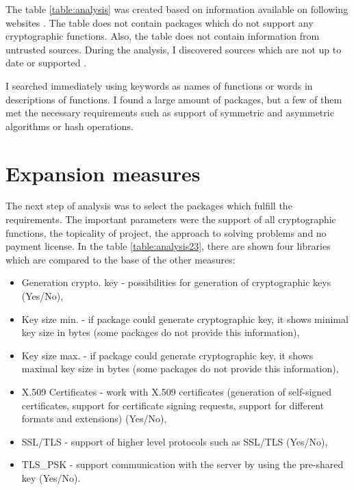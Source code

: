 \documentclass[
  twoside, 12pt, 
  printed, %
  notable,   %
  lof,     %
  lot,     %
]{fithesis3}
\begin{document}
The table \ref{table:analysis} was created based on information available on 
following websites \cite{security-golibrariesAndApps} \cite{cryptography-golibrariesAndApps} 
\cite{crypto-godoc} \cite{packages-thegoprogramminglanguage}. The 
table does not contain packages which do not support any cryptographic functions. Also, 
the table does not contain information from untrusted sources. During the analysis, I 
discovered sources which are not up to date or supported \cite{puregolibs}. 

I searched immediately using keywords as names of functions or words in descriptions of functions. 
I found a large amount of packages, but a few of them met the necessary requirements such as 
support of symmetric and asymmetric algorithms or hash operations. 

\section{Expansion measures}

The next step of analysis was to select the packages which fulfill the requirements. The important 
parameters were the support of all cryptographic functions, the topicality of project, the 
approach to solving problems and no payment license. In the table \ref{table:analysis23}, 
there are shown four libraries which are compared to the base of the other measures:
\vskip0.1in
\begin{itemize}[leftmargin=2em,rightmargin=1em,itemsep=0.75\parskip,parsep=0em,topsep=0em,partopsep=0em]
\item Generation crypto. key - possibilities for generation of cryptographic keys (Yes/No),
\item Key size min. - if package could generate cryptographic key, it shows minimal key size in bytes (some packages do not provide this information),
\item Key size max. - if package could generate cryptographic key, it shows maximal key size in bytes (some packages do not provide this information),
\item X.509 Certificates - work with X.509 certificates (generation of self-signed certificates, support for certificate signing requests, support for different formats and extensions) (Yes/No),
\item SSL/TLS - support of higher level protocols such as SSL/TLS (Yes/No),
\item TLS\_PSK - support communication with the server by using the pre-shared key (Yes/No).
\end{itemize}
\vskip0.1in
\end{document}

